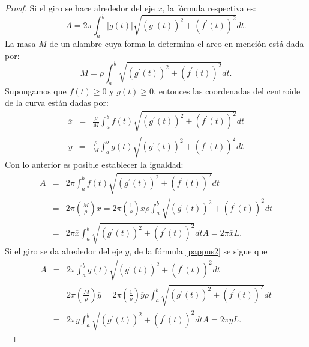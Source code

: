 \begin{proof}
Si el giro se hace alrededor del eje $x$, la fórmula respectiva es:
\[A=2\pi \int_{a}^{b}\left\vert g(t) \right\vert \sqrt{\left(g^{\prime }(t) \right) ^{2}+\left( f^{\prime }(t)\right) ^{2}}dt.\]
La masa $M$ de un alambre cuya forma la determina el arco en mención está dada por:
\[M=\rho \int_{a}^{b}\sqrt{\left( g^{\prime }(t)\right) ^{2}+\left( f^{\prime }(t) \right) ^{2}}dt.\]
Supongamos que $f(t)\geq 0$ y  $g(t)\geq 0$, entonces las coordenadas del centroide de la curva están dadas por:
\begin{eqnarray}
\overline{x} %
&=&\frac{\rho }{M}\int_{a}^{b}f(t) \sqrt{\left( g^{\prime }(t) \right) ^{2}+\left( f^{\prime }(t) \right) ^{2}}dt \label{pappus1}
\end{eqnarray}
\begin{eqnarray}
\overline{y} %
&=& \frac{\rho }{M}\int_{a}^{b}g(t) \sqrt{\left(g^{\prime }(t) \right) ^{2}+\left( f^{\prime }(t)\right) ^{2}}dt\label{pappus2}
\end{eqnarray}
Con lo anterior es posible establecer la igualdad:
\begin{eqnarray*}
A &=& 2\pi \int_{a}^{b}f(t) \sqrt{\left( g^{\prime }(t) \right) ^{2}+\left( f^{\prime }(t) \right) ^{2}}dt \\
&=& 2\pi\left( \frac{M}{\rho }\right) \overline{x}=2\pi \left( \frac{1}{\rho }\right) \overline{x}\rho \int_{a}^{b}\sqrt{\left( g^{\prime }(t)\right) ^{2}+\left( f^{\prime }(t) \right) ^{2}}dt \\
&=& 2\pi \overline{x}\int_{a}^{b}\sqrt{\left( g^{\prime }(t)\right) ^{2}+\left( f^{\prime }(t) \right) ^{2}}dtA=2\pi \overline{x}L.
\end{eqnarray*}
Si el giro se da alrededor del eje $y$, de la fórmula \ref{pappus2} se sigue que
\begin{eqnarray*}
A &=& 2\pi \int_{a}^{b}g(t)\sqrt{\left( g^{\prime }(t) \right) ^{2}+\left( f^{\prime }(t) \right) ^{2}}dt \\
&=& 2\pi\left( \frac{M}{\rho }\right) \overline{y}=2\pi \left( \frac{1}{\rho }\right) \overline{y}\rho \int_{a}^{b}\sqrt{\left( g^{\prime }(t)\right) ^{2}+\left( f^{\prime }(t) \right) ^{2}}dt \\
&=& 2\pi \overline{y}\int_{a}^{b}\sqrt{\left(g^{\prime}(t)\right)^{2}+\left(f^{\prime}(t)\right)^{2}}dtA=2\pi \overline{y}L.
\end{eqnarray*}
\end{proof}

